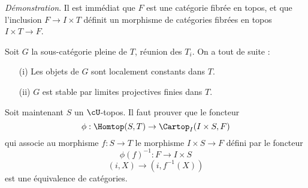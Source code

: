 {\it Démonstration}. Il est immédiat que $F$ est une catégorie fibrée en topos, et que l'inclusion $F \to I \times T$ définit un morphisme de catégories fibrées en topos $I \times T \to F$.

Soit $G$ la sous-catégorie pleine de $T$, réunion des $T_i$. On a tout de suite :
\begin{enumerate}
    \item[(i)] Les objets de $G$ sont localement constants dans $T$.
    \item[(ii)] $G$ est stable par limites projectives finies dans $T$.
\end{enumerate}

Soit maintenant $S$ un $\cU$-topos. Il faut prouver que le foncteur
$$
\phi: \Homtop(S, T) \to \Cartop_I(I \times S, F)
$$
qui associe au morphisme $f: S \to T$ le morphisme $I \times S \to F$ défini par le foncteur
$$
\phi(f)^{-1}: F \to I \times S
$$
$$
(i, X) \to (i, f^{-1}(X))
$$
est une équivalence de catégories.
